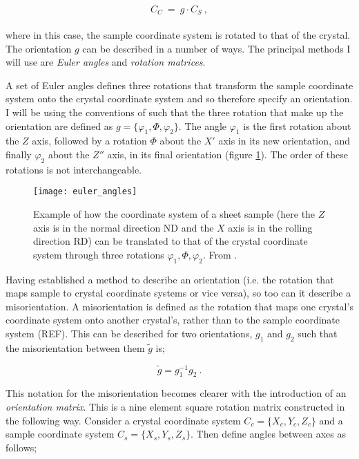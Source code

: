 \documentclass[a4paper,12pt]{report}
\numberwithin{equation}{chapter}
\begin{document}
\begin{equation}
C_C\ =\ g \cdot C_S\ ,
\end{equation}  
\\
where in this case, the sample coordinate system is rotated to that of the crystal. The orientation $g$ can be described in a number of ways. The principal methods I will use are \emph{Euler angles} and \emph{rotation matrices}.


A set of Euler angles defines three rotations that transform the sample coordinate system onto the crystal coordinate system and so therefore specify an orientation. I will be using the conventions of \cite{bunge1982texture} such that the three rotation that make up the orientation are defined as $g = \{\varphi_1,\Phi,\varphi_2\}$. The angle $\varphi_1$ is the first rotation about the $Z$ axis, followed by a rotation $\Phi$ about the $X'$ axis in its new orientation, and finally $\varphi_2$ about the $Z''$ axis, in its final orientation (figure \ref{fig:euler_angles}). The order of these rotations is not interchangeable.




\begin{figure}[h!]
  \centering
    \texttt{[image: euler\_angles]}
  \caption[Euler angle description]{Example of how the coordinate system of a sheet sample (here the $Z$ axis is in the normal direction ND and the $X$ axis is in the rolling direction RD) can be translated to that of the crystal coordinate system through three rotations $\varphi_1,\Phi,\varphi_2$. From \cite{Randle2000}.}
  \label{fig:euler_angles}
\end{figure}

Having established a method to describe an orientation (i.e. the rotation that maps sample to crystal coordinate systems or vice versa), so too can it describe a misorientation. A misorientation is defined as the rotation that maps one crystal's coordinate system onto another crystal's, rather than to the sample coordinate system (REF). This can be described for two orientations, $g_1$ and $g_2$ such that the misorientation between them $\tilde{g}$ is;

\begin{equation} \label{eq:misor_matrix}
\tilde{g} = g_1^{-1}g_2\ .
\end{equation} 

This notation for the misorientation becomes clearer with the introduction of an \emph{orientation matrix}. This is a nine element square rotation matrix constructed in the following way. Consider a crystal coordinate system $C_c = \{X_c,Y_c,Z_c\}$ and a sample coordinate system $C_s = \{X_s,Y_s,Z_s\}$. Then define angles between axes as follows;
\end{document}

